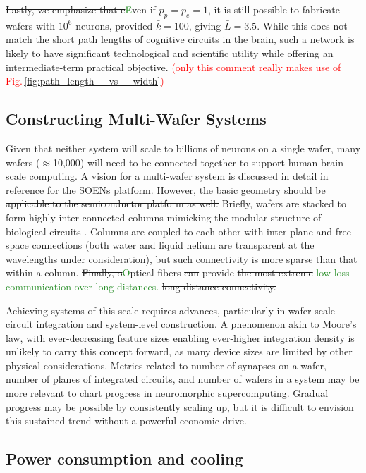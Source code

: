 \documentclass[twocolumn]{article}
\begin{document}
\sout{Lastly, we emphasize that e}\textcolor{ForestGreen}{E}ven if $p_p = p_e = 1$, it is still possible to fabricate wafers with $10^6$ neurons, provided $\bar{k} = 100$, giving $\bar{L} = 3.5$. While this does not match the short path lengths of cognitive circuits in the brain, such a network is likely to have significant technological and scientific utility while offering an intermediate-term practical objective. \textcolor{red}{(only this comment really makes use of Fig.\,\ref{fig:path_length__vs__width})}

\subsection{Constructing Multi-Wafer Systems}
Given that neither system will scale to billions of neurons on a single wafer, many wafers ($\approx$10,000) will need to be connected together to support human-brain-scale computing. A vision for a multi-wafer system is discussed \sout{in detail }in reference \cite{shainline2020optoelectronic} for the SOENs platform. \sout{However, the basic geometry should be applicable to the semiconductor platform as well.} Briefly, wafers are stacked to form highly inter-connected columns mimicking the modular structure of biological circuits \cite{mo1978,mo1997,mela2010,bosp2015,beba2017}. Columns are coupled to each other with inter-plane and free-space connections (both water and liquid helium are transparent at the wavelengths under consideration), but such connectivity is more sparse than that within a column. \sout{Finally, o}\textcolor{ForestGreen}{O}ptical fibers \sout{can} provide \sout{the most extreme} \textcolor{ForestGreen}{low-loss communication over long distances.} \sout{long-distance connectivity.}

Achieving systems of this scale requires advances, particularly in wafer-scale circuit integration and system-level construction. A phenomenon akin to Moore's law, with ever-decreasing feature sizes enabling ever-higher integration density is unlikely to carry this concept forward, as many device sizes are limited by other physical considerations. Metrics related to number of synapses on a wafer, number of planes of integrated circuits, and number of wafers in a system may be more relevant to chart progress in neuromorphic supercomputing. Gradual progress may be possible by consistently scaling up, but it is difficult to envision this sustained trend without a powerful economic drive.  

\subsection{Power consumption and cooling}
\end{document}
